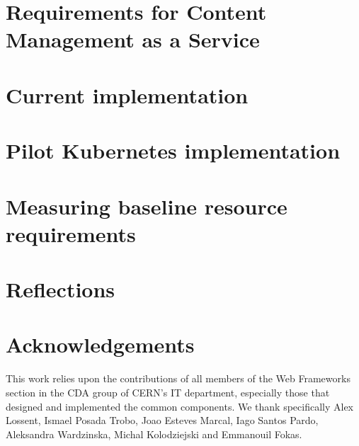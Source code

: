 \documentclass{webofc}
\begin{document}
\section{Requirements for Content Management as a Service}
\label{sec-drupalsvc}


\section{Current implementation}
\label{sec-phys-infra}


\section{Pilot Kubernetes implementation}
\label{sec-k8s-design}


\section{Measuring baseline resource requirements}
\label{sec-experiment}


\section{Reflections}
\label{sec-discussion}


\section*{Acknowledgements}

This work relies upon the contributions of all members of the Web Frameworks section in the CDA group of CERN's IT department,
especially those that designed and implemented the common components.
We thank specifically Alex Lossent, Ismael Posada Trobo, Joao Esteves Marcal, Iago Santos Pardo, Aleksandra Wardzinska, Michal Kolodziejski and Emmanouil Fokas.



\end{document}
